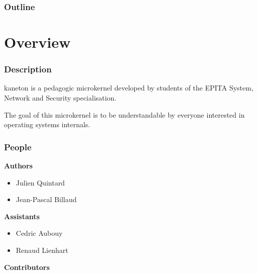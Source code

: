 {%
%



%
%

\begin{frame}
  \titlepage

  \begin{center}
    \logos
  \end{center}
\end{frame}

%
%

\begin{frame}
  \frametitle{Outline}
  \tableofcontents
\end{frame}

%
%

\section{Overview}


\begin{frame}
  \frametitle{Description}

  kaneton is a pedagogic microkernel developed by students of the
  EPITA System, Network and Security specialisation.

  \nl

  The goal of this microkernel is to be understandable by everyone
  interested in operating systems internals.
\end{frame}


\begin{frame}
  \frametitle{People}

  \textbf{Authors}

  \begin{itemize}
    \item
      Julien Quintard
    \item
      Jean-Pascal Billaud
  \end{itemize}

  \nl

  \textbf{Assistants}

  \begin{itemize}
    \item
      Cedric Aubouy
    \item
      Renaud Lienhart
  \end{itemize}

  \nl

  \textbf{Contributors}


\end{frame}}
